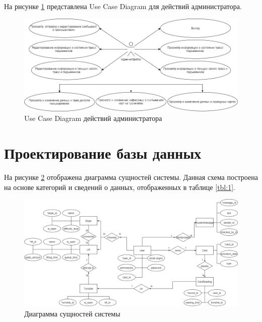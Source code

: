 На рисунке \ref{img:use_case4} представлена Use Case Diagram для действий администратора.

\begin{figure}[h!]
	\begin{center}
		\includegraphics[scale=0.5]{../imgs/use_case/use-case4.png}
	\end{center}
	\captionsetup{justification=centering}
	\caption{Use Case Diagram действий администратора}
	\label{img:use_case4}
\end{figure}



\section{Проектирование базы данных}


На рисунке \ref{img:er} отображена диаграмма сущностей системы. Данная схема построена на основе категорий и сведений о данных, отображенных в таблице \ref{tbl:1}.

\clearpage
\begin{figure}[h!]
	\begin{center}
		\includegraphics[scale=0.4]{../imgs/er/er.png}
	\end{center}
	\captionsetup{justification=centering}
	\caption{Диаграмма сущностей системы}
	\label{img:er}
\end{figure}

